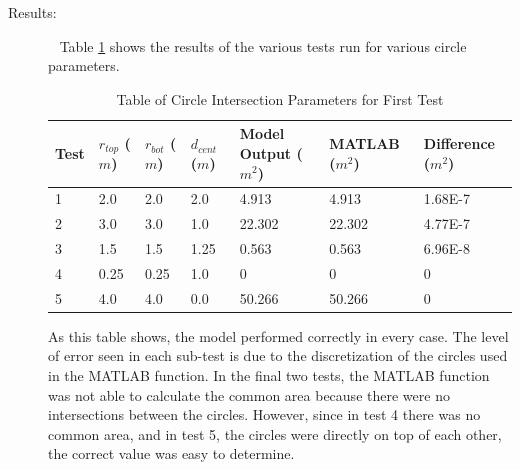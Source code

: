 \begin{description}
\item[Results:]\ \newline
Table \ref{equi_rad_table} shows the results of the various tests run for
various circle parameters.
\begin{table}[ht]
\begin{tabular}{|l|l|l|l|l|l|l|}\hline
 Test & $r_{top}$ ($m$) & $r_{bot}$ ($m$) & $d_{cent}$ ($m$) & Model Output ($m^2$) &
    MATLAB ($m^2$) & Difference ($m^2$) \\ \hline
 1 & 2.0 & 2.0 & 2.0 & 4.913 & 4.913 & 1.68E-7 \\ \hline
 2 & 3.0 & 3.0 & 1.0 & 22.302 & 22.302 & 4.77E-7 \\ \hline
 3 & 1.5 & 1.5 & 1.25 & 0.563 & 0.563 & 6.96E-8 \\ \hline
 4 & 0.25 & 0.25 & 1.0 & 0 & 0 & 0 \\\hline
 5 & 4.0 & 4.0 & 0.0 & 50.266 & 50.266 & 0 \\ \hline
\end{tabular}
\caption{Table of Circle Intersection Parameters for First Test}
\label{equi_rad_table}
\end{table}

As this table shows, the model performed correctly in every case.  The level
of error seen in each sub-test is due to the discretization of the circles used
in the MATLAB function.  In the final two tests, the MATLAB function was not
able to calculate the common area because there were no intersections between
the circles.  However, since in test 4 there was no common area, and in test
5, the circles were directly on top of each other, the correct value was easy
to determine.
\end{description}

